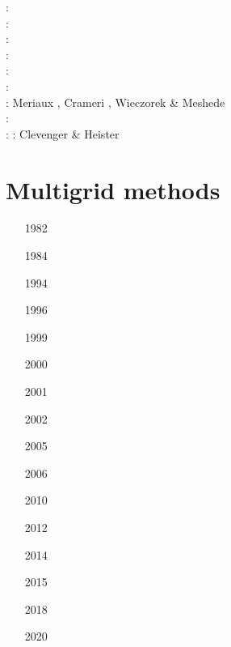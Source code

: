 \begin{scriptsize}
\twothousandtwelve: \cite{crsg12}\cite{chgv12}\cite{krwd12}\cite{may12}\cite{gerb12}\cite{asmo12}\\
\twothousandthirteen: \cite{chtl13}\cite{kemk13}\cite{gemd13}\cite{hutm13}\\
\twothousandfourteen: \cite{thmk14}\cite{mabl14}\cite{lopp14}\cite{stlh14}\\
\twothousandfifteen: \cite{lelk15}\cite{rumi15}\cite{chpe15}\cite{mabl15}\\
\twothousandsixteen: \cite{dumy16}\cite{blmp16}\\
\twothousandseventeen: \cite{robh17}\cite{wisv17}\cite{majc17}\\
\twothousandeighteen: Meriaux \etal \cite{memm18}, Crameri \cite{cram18}, Wieczorek \& Meshede \cite{wime18}\\
\twothousandnineteen: \cite{liki19}\cite{demh19}\cite{galb19}\cite{frtv19}\cite{yuwa19}\cite{ropu19}\\
\twothousandtwenty: \cite{homb20}\cite{trlb20}\cite{gadb20}\cite{jaca20a,jaca20b} 
\twothousandtwentyone: Clevenger \& Heister \cite{clhe21}
\end{scriptsize}


\section{Multigrid methods} 

\begin{scriptsize}
\begin{itemize}
\item[1982]
\item[1984]
\item[1994]
\item[1996]
\item[1999]
\item[2000]
\item[2001]
\item[2002]
\item[2005]
\item[2006]
\item[2010]
\item[2012]
\item[2014]
\item[2015]
\item[2018]
\item[2020]
\end{itemize}
\end{scriptsize}



